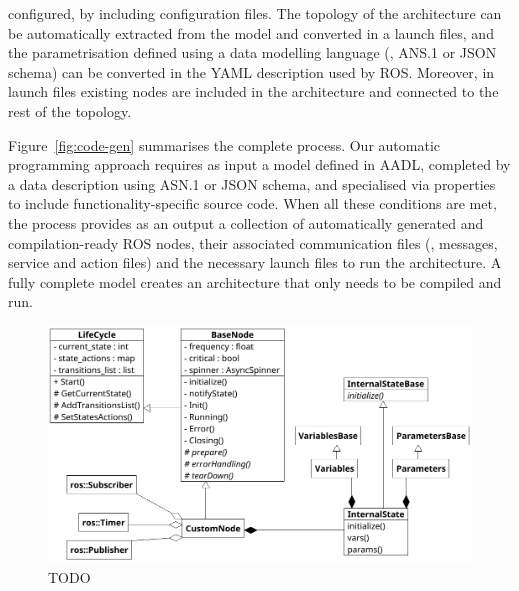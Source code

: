 configured, by including configuration files. The topology of the architecture can be automatically extracted from the model and converted in a launch files, and the parametrisation defined using a data modelling language (\ie, ANS.1 or JSON schema) can be converted in the YAML description used by ROS. Moreover, in launch files existing nodes are included in the architecture and connected to the rest of the topology.

Figure~\ref{fig:code-gen} summarises the complete process. Our automatic programming approach requires as input a model defined in AADL, completed by a data description using ASN.1 or JSON schema, and specialised via properties to include functionality-specific source code. When all these conditions are met, the process provides as an output a collection of automatically generated and compilation-ready ROS nodes, their associated communication files (\ie, messages, service and action files) and the necessary launch files to run the architecture. A fully complete model creates an architecture that only needs to be compiled and run.

\begin{figure}[t]
    \centering
    \includegraphics[width=\textwidth]{gfx/class}
    \caption{TODO}\label{fig:node-class}
\end{figure}

